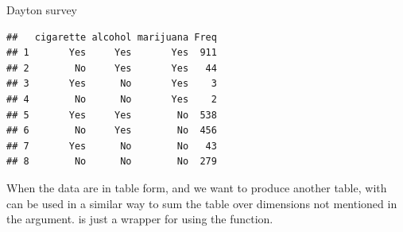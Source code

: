 \documentclass[11pt]{book}
\renewenvironment{knitrout}{\small\renewcommand{\baselinestretch}{.85}}{} %
\begin{document}
\begin{Example}[dayton1]{Dayton survey}
\begin{knitrout}
\color{fgcolor}\begin{kframe}
\begin{alltt}
 \hlkwb{<-}  \hlopt{~} \hlopt{+}\hlopt{+}
                            
\end{alltt}
\begin{verbatim}
##   cigarette alcohol marijuana Freq
## 1       Yes     Yes       Yes  911
## 2        No     Yes       Yes   44
## 3       Yes      No       Yes    3
## 4        No      No       Yes    2
## 5       Yes     Yes        No  538
## 6        No     Yes        No  456
## 7       Yes      No        No   43
## 8        No      No        No  279
\end{verbatim}
\end{kframe}
\end{knitrout}
\end{Example}

When the data are in table form, and we want to produce another
table,  with  can be used in a similar way
to sum the table over dimensions not mentioned in the 
argument.   is just a wrapper for 
using the  function.
\end{document}
